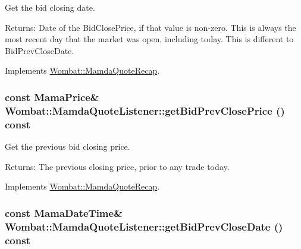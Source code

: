 Get the bid closing date. 

\begin{Desc}
\item[Returns:]Date of the Bid\-Close\-Price, if that value is non-zero. This is always the most recent day that the market was open, including today. This is different to Bid\-Prev\-Close\-Date. \end{Desc}


Implements \hyperlink{classWombat_1_1MamdaQuoteRecap_fe853f4d35ca2a5c464110529c97c20f}{Wombat::Mamda\-Quote\-Recap}.\hypertarget{classWombat_1_1MamdaQuoteListener_637f9ad1c4a4523725dd5b9f12da169e}{
\subsubsection[getBidPrevClosePrice]{\setlength{\rightskip}{0pt plus 5cm}const Mama\-Price\& Wombat::Mamda\-Quote\-Listener::get\-Bid\-Prev\-Close\-Price () const}}
\label{classWombat_1_1MamdaQuoteListener_637f9ad1c4a4523725dd5b9f12da169e}


Get the previous bid closing price. 

\begin{Desc}
\item[Returns:]The previous closing price, prior to any trade today. \end{Desc}


Implements \hyperlink{classWombat_1_1MamdaQuoteRecap_5a0ba795de4b02302093d082484030f8}{Wombat::Mamda\-Quote\-Recap}.\hypertarget{classWombat_1_1MamdaQuoteListener_e1cbe538d859cde30b322ca78616df43}{
\subsubsection[getBidPrevCloseDate]{\setlength{\rightskip}{0pt plus 5cm}const Mama\-Date\-Time\& Wombat::Mamda\-Quote\-Listener::get\-Bid\-Prev\-Close\-Date () const}}
\label{classWombat_1_1MamdaQuoteListener_e1cbe538d859cde30b322ca78616df43}


